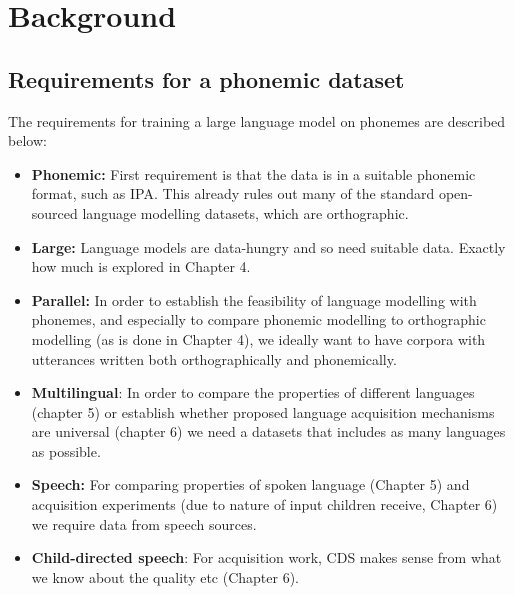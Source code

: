 
\section{Background}
\label{sec:dataset-background}


\subsection{Requirements for a phonemic dataset}

The requirements for training a large language model on phonemes are described below:

\begin{itemize}
    \item \textbf{Phonemic:} First requirement is that the data is in a suitable phonemic format, such as IPA. This already rules out many of the standard open-sourced language modelling datasets, which are orthographic.
    \item \textbf{Large:} Language models are data-hungry and so need suitable data. Exactly how much is explored in Chapter 4.
    \item \textbf{Parallel:} In order to establish the feasibility of language modelling with phonemes, and especially to compare phonemic modelling to orthographic modelling (as is done in Chapter 4), we ideally want to have corpora with utterances written both orthographically and phonemically.
    \item \textbf{Multilingual}: In order to compare the properties of different languages (chapter 5) or establish whether proposed language acquisition mechanisms are universal (chapter 6) we need a datasets that includes as many languages as possible.
    \item \textbf{Speech:} For comparing properties of spoken language (Chapter 5) and acquisition experiments (due to nature of input children receive, Chapter 6) we require data from speech sources.
    \item \textbf{Child-directed speech}: For acquisition work, CDS makes sense from what we know about the quality etc (Chapter 6). 
\end{itemize}


